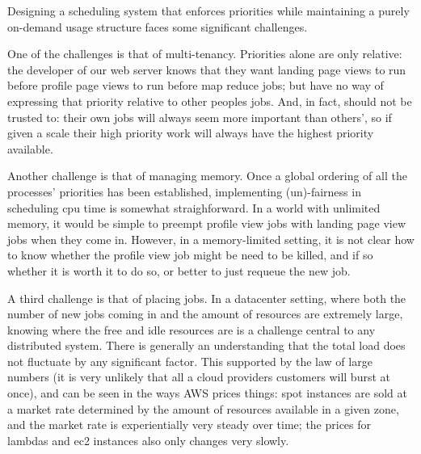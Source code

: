 

Designing a scheduling system that enforces priorities while maintaining a
purely on-demand usage structure faces some significant challenges.


One of the challenges is that of multi-tenancy. Priorities alone are only
relative: the developer of our web server knows that they want landing page
views to run before profile page views to run before map reduce jobs; but have
no way of expressing that priority relative to other peoples jobs. And, in fact,
should not be trusted to: their own jobs will always seem more important than
others', so if given a scale their high priority work will always have the
highest priority available.

Another challenge is that of managing memory. Once a global ordering of all the
processes' priorities has been established, implementing (un)-fairness in
scheduling cpu time is somewhat straighforward. In a world with unlimited
memory, it would be simple to preempt profile view jobs with landing page view
jobs when they come in. However, in a memory-limited setting, it is not clear
how to know whether the profile view job might be need to be killed, and if so
whether it is worth it to do so, or better to just requeue the new job.

A third challenge is that of placing jobs. In a datacenter setting, where both
the number of new jobs coming in and the amount of resources are extremely
large, knowing where the free and idle resources are is a challenge central to
any distributed system. There is generally an understanding that the total load
does not fluctuate by any significant factor. This supported by the law of large
numbers (it is very unlikely that all a cloud providers customers will burst at
once), and can be seen in the ways AWS prices things: spot instances are sold at
a market rate determined by the amount of resources available in a given
zone\cite{TODO}, and the market rate is experientially very steady over
time\cite{TODO}; the prices for lambdas and ec2 instances also only changes very
slowly\cite{TODO}.
